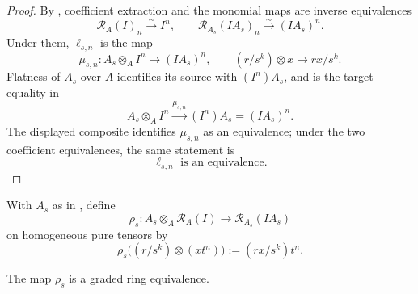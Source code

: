 \begin{proof}
  By , coefficient extraction and
  the monomial maps are inverse equivalences
  \[
    \mathcal R_A(I)_n\xrightarrow{\sim}I^n,
    \qquad
    \mathcal R_{A_s}(IA_s)_n\xrightarrow{\sim}(IA_s)^n.
  \]
  Under them, $\ell_{s,n}$ is the map
  \[
    \mu_{s,n}\colon A_s\otimes_AI^n\longrightarrow(IA_s)^n,
    \qquad (r/s^k)\otimes x\longmapsto rx/s^k.
  \]
  Flatness of $A_s$ over $A$ identifies its source with $(I^n)A_s$, and
   is the target equality in
  \[
    A_s\otimes_AI^n\xrightarrow{\mu_{s,n}}(I^n)A_s
      =(IA_s)^n.
  \]
  The displayed composite identifies $\mu_{s,n}$ as an equivalence; under
  the two coefficient equivalences, the same statement is
  \[
    \ell_{s,n}\text{ is an equivalence}.
  \]
\end{proof}

\begin{definition}
  \label{def:nagata-rees-localization-map}

  With $A_s$ as in , define
  \[
    \rho_s\colon A_s\otimes_A\mathcal R_A(I)
      \longrightarrow\mathcal R_{A_s}(IA_s)
  \]
  on homogeneous pure tensors by
  \[
    \rho_s\bigl((r/s^k)\otimes(xt^n)\bigr)
      :=(rx/s^k)t^n.
  \]
\end{definition}

\begin{proposition}
  \label{prop:nagata-rees-localization}

  The map $\rho_s$ is a graded ring equivalence.
\end{proposition}

